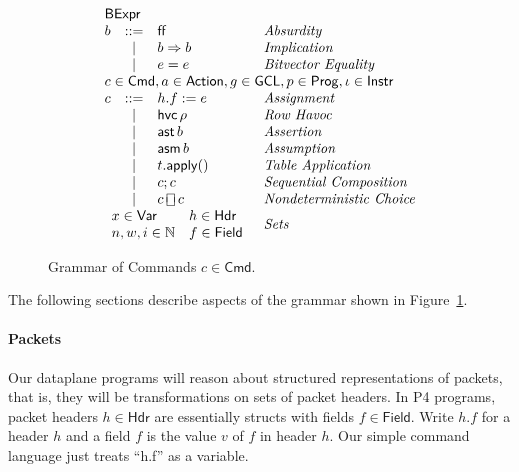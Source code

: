\documentclass{article}
\newcommand{\FALSE}{\mathsf{ff}}
\newcommand{\BExpr}{\mathsf{BExpr}}
\newcommand{\Cmd}{\mathsf{Cmd}}
\newcommand{\Action}{\mathsf{Action}}
\newcommand{\Instr}{\mathsf{Instr}}
\newcommand{\Prog}{\mathsf{Prog}}
\newcommand{\GCL}{\mathsf{GCL}}
\newcommand{\Hdr}{\mathsf{Hdr}}
\newcommand{\Field}{\mathsf{Field}}
\newcommand{\Var}{\mathsf{Var}}
\newcommand{\assert}{\mathop{\mathsf{ast}}}
\newcommand{\assume}{\mathop{\mathsf{asm}}}
\newcommand{\apply}{\mathsf{apply}}
\newcommand{\choiceop}{\rotatebox[origin=c]{90}{$\sqsubset\!\!\!\sqsupset$}}
\newcommand{\choice}{\mathbin{\choiceop}}
\newcommand{\havoc}[1]{\mathop{\mathsf{hvc}}#1}
\begin{document}
\begin{figure}[htp]
\[\begin{array}{lclll}
    \multicolumn{3}{l}{\BExpr} \\
    b & ::= & \FALSE  & \textit{Absurdity}\\
      & \mid & b \Rightarrow b & \textit{Implication}\\
    & \mid & e = e & \textit{Bitvector Equality}\\
    \multicolumn{4}{l}{c \in \Cmd, a \in \Action, g \in \GCL, p \in \Prog, \iota \in \Instr } \\
    c & ::=  & h.f := e & \textit{Assignment} \\
      & \mid & \havoc \rho & \textit{Row Havoc} \\
      & \mid & \assert b & \textit{Assertion}\\
      & \mid & \assume b & \textit{Assumption} \\
      & \mid & t.\apply() & \textit{Table Application} \\
      & \mid & c;c & \textit{Sequential Composition} \\
      & \mid & c \choice c & \textit{Nondeterministic Choice} \\
    \multicolumn{3}{l}{
      \begin{array}{ll}
        x \in \Var & h \in \Hdr\\
        n,w,i \in \mathbb{N} & f \in \Field
    \end{array}} & \textit{Sets }\\
  \end{array}
\]
\caption{Grammar of Commands $c \in \Cmd$.}
\label{fig:grammar}
\end{figure}

The following sections describe aspects of the grammar shown in Figure~\ref{fig:grammar}.

\paragraph{Packets}
Our dataplane programs will reason about structured representations of packets,
that is, they will be transformations on sets of packet headers. In P4 programs,
packet headers $h \in \Hdr$ are essentially structs with fields $f \in \Field$.
Write $h.f$ for a header $h$ and a field $f$ is the value $v$ of $f$ in header
$h$. Our simple command language just treats ``h.f'' as a variable.
\end{document}
